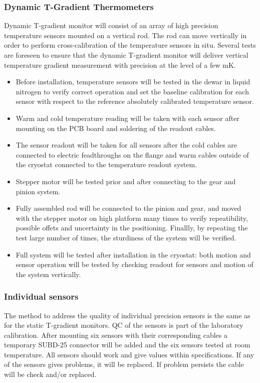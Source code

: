 \subsubsection{Dynamic T-Gradient Thermometers}
\label{sec:fdgen-slow-cryo-qc-thdy}

Dynamic T-gradient monitor will consist of an array of high precision temperature sensors mounted on a vertical rod. The rod can move vertically in order to perform cross-calibration of the temperature sensors in situ. Several tests are foreseen to ensure that the dynamic T-gradient monitor will deliver vertical temperature gradient measurement with precision at the level of a few mK.

\begin{itemize}
\item
Before installation, temperature sensors will be tested in the dewar in liquid nitrogen to verify correct operation and set the baseline calibration for each sensor with respect to the reference absolutely calibrated temperature sensor.
\item
Warm and cold temperature reading will be taken with each sensor after mounting on the PCB board and soldering of the readout cables.
\item
The sensor readout will be taken for all sensors after the cold cables are connected to electric feadthroughs on the flange and warm cables outside of the cryostat connected to the temperature readout system.
\item 
Stepper motor will be tested prior and after connecting to the gear and pinion system.
\item
Fully assembled rod will be connected to the pinion and gear, and moved with the stepper motor on high platform many times to verify repeatibility, possible offets and uncertainty in the positioning. Finallly, by repeating the test large number of times, the sturdiness of the system will be verified.
\item
Full system will be tested after installation in the cryostat: both motion and sensor operation will be tested by checking readout for sensors and motion of the system vertically.
\end{itemize} 

\subsubsection{Individual sensors}
\label{sec:fdgen-slow-cryo-qc-is}

The method to address the quality of individual precision sensors is the same as for the static T-gradient monitors.
QC of the sensors is part of the laboratory calibration. After mounting six sensors with their corresponding cables a
temporary SUBD-25 connector will be added and the six sensors tested at room temperature. All sensors should work and give values within specifications.  
If any of the sensors gives problems, it will be replaced. If problem persists the cable will be check and/or replaced.

